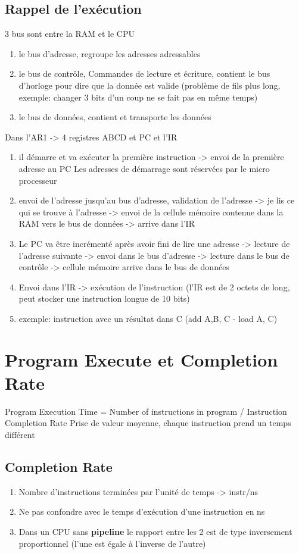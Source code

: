 \subsection{Rappel de l'exécution}
3 bus sont entre la RAM et le CPU
\begin{enumerate}
\item le bus d'adresse, regroupe les adresses adressables
\item le bus de contrôle, Commandes de lecture et écriture, contient le bus d'horloge pour dire que la donnée est valide (problème de fils plus long, exemple: changer 3 bits d'un coup ne se fait pas en même temps) 
\item le bus de données, contient et transporte les données
\end{enumerate}
Dans l'AR1 -> 4 registres ABCD et PC et l'IR
\begin{enumerate}
  \item il démarre et va exécuter la première instruction -> envoi de la première adresse au PC
  Les adresses de démarrage sont réservées par le micro processeur
  \item envoi de l'adresse jusqu'au bus d'adresse, validation de l'adresse -> je lis ce qui se trouve à l'adresse -> envoi de la cellule mémoire contenue dans la RAM vers le bus de données -> arrive dans l'IR
  \item Le PC va être incrémenté après avoir fini de lire une adresse -> lecture de l'adresse suivante -> envoi dans le bus d'adresse -> lecture dans le bus de contrôle -> cellule mémoire arrive dans le bus de données 
  \item Envoi dans l'IR -> exécution de l'instruction (l'IR est de 2 octets de long, peut stocker une instruction longue de 10 bits)
  \item exemple: instruction avec un résultat dans C (add A,B, C - load A, C)

\end{enumerate}

\section{Program Execute et Completion Rate}
Program Execution Time = Number of instructions in program / Instruction Completion Rate
Prise de valeur moyenne, chaque instruction prend un temps différent

\subsection{Completion Rate}
\begin{enumerate}
  \item Nombre d'instructions terminées par l'unité de temps -> instr/ns
  \item Ne pas confondre avec le temps d'exécution d'une instruction en ns
  \item Dans un CPU sans \textbf{pipeline} le rapport entre les 2 est de type inversement proportionnel (l'une est égale à l'inverse de l'autre)
\end{enumerate}


